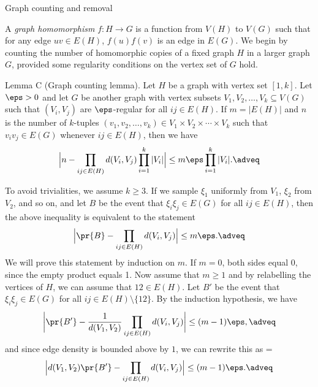\advsect Graph counting and removal

A {\it graph homomorphism} $f: H\to G$ is a function from $V(H)$ to $V(G)$ such that for any edge $uv\in E(H)$,
$f(u)f(v)$ is an edge in $E(G)$.
We begin by counting the number of homomorphic copies of a fixed graph $H$ in a larger graph
$G$, provided some regularity conditions on the vertex set of $G$ hold.

\parenproclaim Lemma C (Graph counting lemma). Let $H$ be a graph with vertex set $[1,k]$.
Let $\eps>0$ and let $G$ be another
graph with vertex subsets $V_1,V_2,\ldots,V_k\subseteq V(G)$ such that $(V_i,V_j)$ are $\eps$-regular for all
$ij\in E(H)$. If $m = \big|E(H)\big|$ and $n$ is the number of $k$-tuples
$(v_1,v_2,\ldots,v_k)\in V_1\times V_2\times\cdots\times V_k$ such that
$v_iv_j\in E(G)$ whenever $ij\in E(H)$, then we have
$$\Big|n - \prod_{ij\in E(H)} d(V_i,V_j) \prod_{i=1}^k |V_i|\Big|\leq m\eps \prod_{i=1}^k |V_i|.\adveq$$

\proof To avoid trivialities, we assume $k\geq 3$.
If we sample $\xi_1$ uniformly from $V_1$, $\xi_2$ from $V_2$, and so on, and
let $B$ be the event that $\xi_i\xi_j\in E(G)$ for all $ij\in E(H)$,
then the above inequality is equivalent to the statement
$$\Big|\pr\{B\} - \prod_{ij\in E(H)} d(V_i,V_j)\Big| \leq m\eps.\adveq$$
We will prove this statement by induction on $m$. If $m = 0$, both sides equal $0$, since the empty product equals 1.
Now assume that $m\geq 1$ and by relabelling the vertices of $H$, we can assume that $12\in E(H)$. Let $B'$ be the
event that $\xi_i\xi_j\in E(G)$ for all $ij\in E(H)\setminus\{12\}$. By the induction hypothesis, we have
$$\bigg|\pr\{B'\} - {1\over d(V_1,V_2)}\prod_{ij\in E(H)} d(V_i,V_j)\bigg| \leq (m-1)\eps,\adveq$$
and since edge density is bounded above by $1$, we can rewrite this as
\newcount\ih
\ih=\eqcount
$$\Big|d(V_1,V_2)\pr\{B'\} - \prod_{ij\in E(H)} d(V_i,V_j)\Big| \leq (m-1)\eps.\adveq$$

